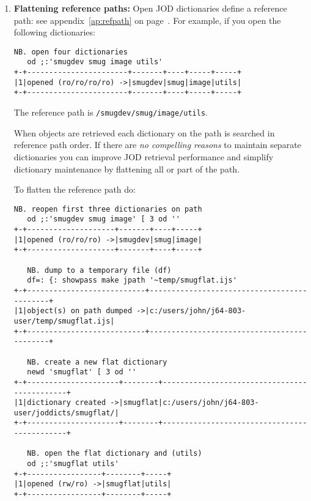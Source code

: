 \begin{enumerate}

\item \textbf{Flattening reference paths:} Open JOD dictionaries define a reference path: see appendix~\ref{ap:refpath} on page~\pageref{ap:refpath}.
For example, if you open the following dictionaries:

\begin{lstlisting}[frame=single,framerule=0pt,basicstyle=\ttfamily\footnotesize]
   NB. open four dictionaries
   od ;:'smugdev smug image utils'
+-+-----------------------+-------+----+-----+-----+
|1|opened (ro/ro/ro/ro) ->|smugdev|smug|image|utils|
+-+-----------------------+-------+----+-----+-----+
\end{lstlisting}

The reference path is \texttt{/smugdev/smug/image/utils}.

When objects are retrieved each dictionary on the path is searched in reference path order.
If there are \emph{no compelling reasons} to maintain separate dictionaries you can improve
JOD retrieval performance and simplify dictionary maintenance by flattening all or part of the path. 

To flatten the reference path do:

\begin{lstlisting}[frame=single,framerule=0pt,basicstyle=\ttfamily\footnotesize]
   NB. reopen first three dictionaries on path
   od ;:'smugdev smug image' [ 3 od ''
+-+--------------------+-------+----+-----+
|1|opened (ro/ro/ro) ->|smugdev|smug|image|
+-+--------------------+-------+----+-----+

   NB. dump to a temporary file (df)
   df=: {: showpass make jpath '~temp/smugflat.ijs'
+-+---------------------------+--------------------------------------------+
|1|object(s) on path dumped ->|c:/users/john/j64-803-user/temp/smugflat.ijs|
+-+---------------------------+--------------------------------------------+

   NB. create a new flat dictionary
   newd 'smugflat' [ 3 od ''
+-+---------------------+--------+---------------------------------------------+
|1|dictionary created ->|smugflat|c:/users/john/j64-803-user/joddicts/smugflat/|
+-+---------------------+--------+---------------------------------------------+

   NB. open the flat dictionary and (utils)
   od ;:'smugflat utils'
+-+-----------------+--------+-----+
|1|opened (rw/ro) ->|smugflat|utils|
+-+-----------------+--------+-----+
  

\end{lstlisting}
\end{enumerate}
